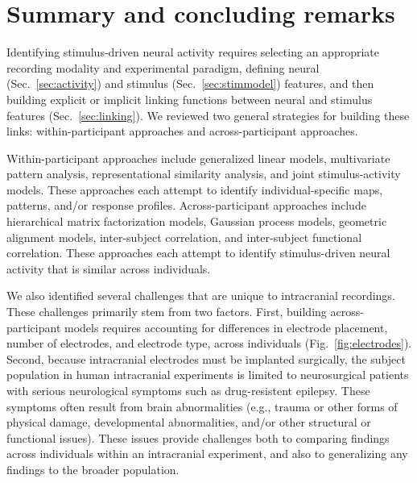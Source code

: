 \documentclass[runningheads]{llncs}
\begin{document}
\section{Summary and concluding remarks}
Identifying stimulus-driven neural activity requires selecting an
appropriate recording modality and experimental paradigm, defining
neural (Sec.~\ref{sec:activity}) and stimulus
(Sec.~\ref{sec:stimmodel}) features, and then building explicit or
implicit linking functions between neural and stimulus features
(Sec.~\ref{sec:linking}).  We reviewed two general strategies for
building these links: within-participant approaches and
across-participant approaches.

Within-participant approaches include generalized linear models,
multivariate pattern analysis, representational similarity analysis,
and joint stimulus-activity models.  These approaches each attempt to
identify individual-specific maps, patterns, and/or response
profiles.  Across-participant approaches include hierarchical matrix
factorization models, Gaussian process models, geometric alignment
models, inter-subject correlation, and inter-subject functional
correlation.  These approaches each attempt to identify
stimulus-driven neural activity that is similar across individuals.

We also identified several challenges that are unique to intracranial
recordings.  These challenges primarily stem from two factors.  First,
building across-participant models requires accounting for differences
in electrode placement, number of electrodes, and electrode type,
across individuals (Fig.~\ref{fig:electrodes}).  Second, because
intracranial electrodes must be implanted surgically, the subject
population in human intracranial experiments is limited to
neurosurgical patients with serious neurological symptoms such as
drug-resistent epilepsy.  These symptoms often result from brain
abnormalities (e.g., trauma or other forms of physical damage, developmental
abnormalities, and/or other structural or functional issues).  These
issues provide challenges both to comparing findings across
individuals within an intracranial experiment, and also to
generalizing any findings to the broader population.
\end{document}
